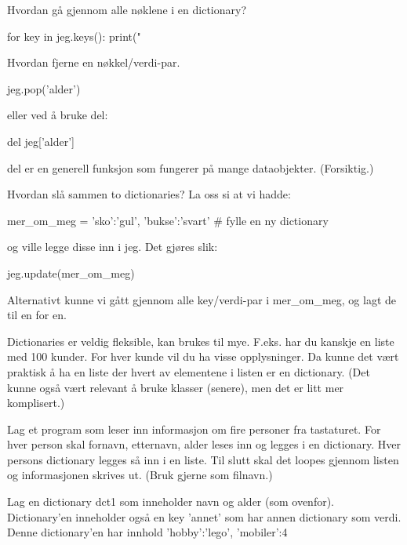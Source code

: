 Hvordan gå gjennom alle nøklene i en dictionary?
\begin{usncodebox}
for key in jeg.keys():
   print("  %
\end{usncodebox}

Hvordan fjerne en nøkkel/verdi-par. 
\begin{usncodebox}
jeg.pop('alder')
\end{usncodebox}

eller ved å bruke del: 
\begin{usncodebox}
del jeg['alder']
\end{usncodebox}

del er en generell funksjon som fungerer på mange dataobjekter. (Forsiktig.) 

Hvordan slå sammen to dictionaries?
La oss si at vi hadde:
\begin{usncodebox}
mer_om_meg = {'sko':'gul', 'bukse':'svart'}   # fylle en ny dictionary
\end{usncodebox}
og ville legge disse inn i jeg. Det gjøres slik:
\begin{usncodebox}
jeg.update(mer_om_meg)
\end{usncodebox}
Alternativt kunne vi gått gjennom alle key/verdi-par i mer\_{}om\_{}meg, og lagt de til en for en.

Dictionaries er veldig fleksible, kan brukes til mye. F.eks. har du kanskje en liste med 100 kunder. For hver kunde vil du ha visse opplysninger. Da kunne det vært praktisk å ha en liste der hvert av elementene i listen er en dictionary. (Det kunne også vært relevant å bruke klasser (senere), men det er litt mer komplisert.)

\begin{exercise}
Lag et program som leser inn informasjon om fire personer fra tastaturet. For hver person skal fornavn, etternavn, alder leses inn og legges i en dictionary. Hver persons dictionary legges så inn i en liste. Til slutt skal det loopes gjennom listen og informasjonen skrives ut. (Bruk gjerne  som filnavn.)
\end{exercise} 

\begin{exercise}
Lag en dictionary dct1 som inneholder navn og alder (som ovenfor). Dictionary'en inneholder også en key 'annet' som har annen dictionary som verdi. Denne dictionary'en har innhold {'hobby':'lego', 'mobiler':4}
\end{exercise}

